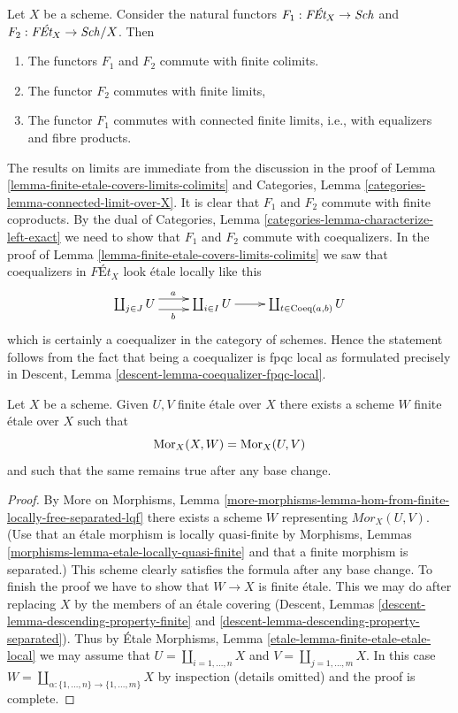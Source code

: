 \begin{remark}
\label{remark-colimits-commute-forgetful}
Let $X$ be a scheme. Consider the natural functors
$F_1 : \textit{F\'Et}_X \to \mathit{Sch}$ and $F_2 : \textit{F\'Et}_X \to \mathit{Sch}/X$.
Then
\begin{enumerate}
\item The functors $F_1$ and $F_2$ commute with finite colimits.
\item The functor $F_2$ commutes with finite limits,
\item The functor $F_1$ commutes with connected finite limits, i.e.,
with equalizers and fibre products.
\end{enumerate}
The results on limits are immediate from the discussion in
the proof of Lemma \ref{lemma-finite-etale-covers-limits-colimits}
and Categories, Lemma \ref{categories-lemma-connected-limit-over-X}.
It is clear that $F_1$ and $F_2$ commute with finite coproducts.
By the dual of Categories, Lemma
\ref{categories-lemma-characterize-left-exact}
we need to show that $F_1$ and $F_2$ commute with coequalizers.
In the proof of Lemma \ref{lemma-finite-etale-covers-limits-colimits}
we saw that coequalizers in $\textit{F\'Et}_X$ look \'etale locally
like this
$$
\xymatrix{
\coprod_{j \in J} U \ar@<1ex>[r]^a \ar@<-1ex>[r]_b &
\coprod_{i \in I} U \ar[r] &
\coprod_{t \in \text{Coeq}(a, b)} U
}
$$
which is certainly a coequalizer in the category of schemes.
Hence the statement follows from the fact that being a coequalizer
is fpqc local as formulated precisely in
Descent, Lemma \ref{descent-lemma-coequalizer-fpqc-local}.
\end{remark}

\begin{lemma}
\label{lemma-internal-hom-finite-etale}
Let $X$ be a scheme. Given $U, V$ finite \'etale over $X$ there
exists a scheme $W$ finite \'etale over $X$ such that
$$
\mathop{\mathrm{Mor}}\nolimits_X(X, W) = \mathop{\mathrm{Mor}}\nolimits_X(U, V)
$$
and such that the same remains true after any base change.
\end{lemma}

\begin{proof}
By More on Morphisms, Lemma
\ref{more-morphisms-lemma-hom-from-finite-locally-free-separated-lqf}
there exists a scheme $W$ representing $\mathit{Mor}_X(U, V)$.
(Use that an \'etale morphism is locally quasi-finite by
Morphisms, Lemmas \ref{morphisms-lemma-etale-locally-quasi-finite}
and that a finite morphism is separated.)
This scheme clearly satisfies the formula after any base change.
To finish the proof we have to show that $W \to X$ is finite \'etale.
This we may do after replacing $X$ by the members of an \'etale
covering (Descent, Lemmas \ref{descent-lemma-descending-property-finite}
and \ref{descent-lemma-descending-property-separated}).
Thus by \'Etale Morphisms, Lemma \ref{etale-lemma-finite-etale-etale-local}
we may assume that $U = \coprod_{i = 1, \ldots, n} X$
and $V = \coprod_{j = 1, \ldots, m} X$.
In this case
$W = \coprod_{\alpha : \{1, \ldots, n\} \to \{1, \ldots, m\}} X$
by inspection (details omitted) and the proof is complete.
\end{proof}

